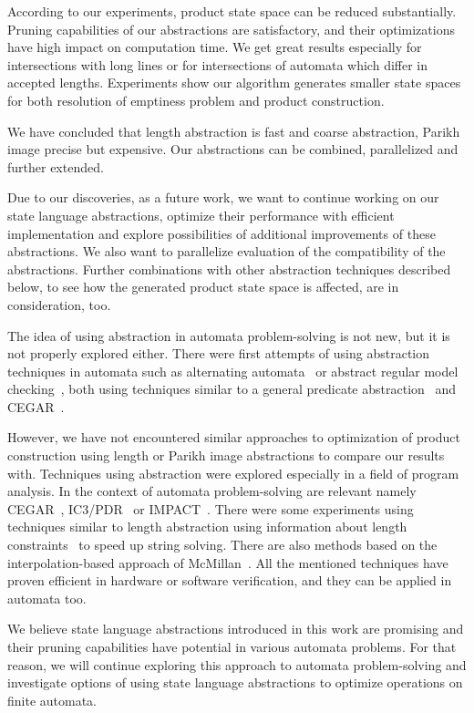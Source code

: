 According to our experiments, product state space can be reduced substantially. Pruning capabilities of our abstractions are satisfactory, and their optimizations have high impact on computation time. We get great results especially for intersections with long lines or for intersections of automata which differ in accepted lengths. Experiments show our algorithm generates smaller state spaces for both resolution of emptiness problem and product construction.

We have concluded that length abstraction is fast and coarse abstraction, Parikh image precise but expensive. Our abstractions can be combined, parallelized and further extended.

Due to our discoveries, as a future work, we want to continue working on our state language abstractions, optimize their performance with efficient implementation and explore possibilities of additional improvements of these abstractions. We also want to parallelize evaluation of the compatibility of the abstractions. Further combinations with other abstraction techniques described below, to see how the generated product state space is affected, are in consideration, too.

The idea of using abstraction in automata problem-solving is not new, but it is not properly explored either. There were first attempts of using abstraction techniques in automata such as alternating automata~\cite{GANTY20103444} or abstract regular model checking~\cite{method_model_checking_tool, rmc_upside_down}, both using techniques similar to a general predicate abstraction~\cite{DBLP:conf/cav/ColonU98, DBLP:conf/cav/GrafS97} and CEGAR~\cite{DBLP:conf/cav/ClarkeGJLV00}.

However, we have not encountered similar approaches to optimization of product construction using length or Parikh image abstractions to compare our results with. Techniques using abstraction were explored especially in a field of program analysis. In the context of automata problem-solving are relevant namely CEGAR~\cite{DBLP:conf/cav/ClarkeGJLV00}, IC3/PDR~\cite{DBLP:conf/sat/HoderB12, DBLP:conf/fmcad/BradleyM07, DBLP:journals/pacmpl/HolikJLRV18, DBLP:conf/cav/WangTLYJ16, DBLP:journals/corr/abs-1708-09073} or IMPACT~\cite{DBLP:conf/cav/McMillan06}. There were some experiments using techniques similar to length abstraction using information about length constraints~\cite{10.1007/978-3-030-81688-9_14} to speed up string solving. There are also methods based on the interpolation-based approach of McMillan~\cite{DBLP:conf/tacas/AmlaM07, DBLP:conf/tacas/GangeNSSS13}. All the mentioned techniques have proven efficient in hardware or software verification, and they can be applied in automata too.

We believe state language abstractions introduced in this work are promising and their pruning capabilities have potential in various automata problems. For that reason, we will continue exploring this approach to automata problem-solving and investigate options of using state language abstractions to optimize operations on finite automata.
